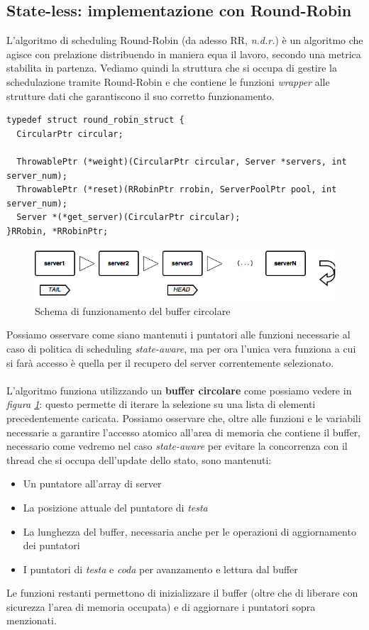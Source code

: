 \documentclass[italian]{tktltiki2}
\begin{document}
\subsection{State-less: implementazione con Round-Robin}
L'algoritmo di scheduling Round-Robin (da adesso RR, \emph{n.d.r.}) è un algoritmo che agisce con prelazione distribuendo in maniera equa il lavoro, secondo una metrica stabilita in partenza. Vediamo quindi la struttura che si occupa di gestire la schedulazione tramite Round-Robin e che contiene le funzioni \emph{wrapper} alle strutture dati che garantiscono il suo corretto funzionamento.
\begin{lstlisting}
typedef struct round_robin_struct {
  CircularPtr circular;

  ThrowablePtr (*weight)(CircularPtr circular, Server *servers, int server_num);
  ThrowablePtr (*reset)(RRobinPtr rrobin, ServerPoolPtr pool, int server_num);
  Server *(*get_server)(CircularPtr circular);
}RRobin, *RRobinPtr;

\end{lstlisting}
\begin{figure}[b]
\centering
\includegraphics[width=\textwidth]{images/rrobin_stateless}
\caption{Schema di funzionamento del buffer circolare \label{fig: rrobin_sl}}
\end{figure}
Possiamo osservare come siano mantenuti i puntatori alle funzioni necessarie al caso di politica di scheduling \emph{state-aware}, ma per ora l'unica vera funziona a cui si farà accesso è quella per il recupero del server correntemente selezionato. 
\\
\\
L'algoritmo funziona utilizzando un \textbf{buffer circolare} come possiamo vedere in \emph{figura \ref{fig: rrobin_sl}}: questo permette di iterare la selezione su una lista di elementi precedentemente caricata. Possiamo osservare che, oltre alle funzioni e le variabili necessarie a garantire l'accesso atomico all'area di memoria che contiene il buffer, necessario come vedremo nel caso \emph{state-aware} per evitare la concorrenza con il thread che si occupa dell'update dello stato, sono mantenuti:
  \begin{itemize}
      \item Un puntatore all'array di server 
      \item La posizione attuale del puntatore di \emph{testa} 
      \item La lunghezza del buffer, necessaria anche per le operazioni di aggiornamento dei puntatori
      \item I puntatori di \emph{testa} e \emph{coda} per avanzamento e lettura dal buffer
  \end{itemize}
Le funzioni restanti permettono di inizializzare il buffer (oltre che di liberare con sicurezza l'area di memoria occupata) e di aggiornare i puntatori sopra menzionati.
\end{document}
